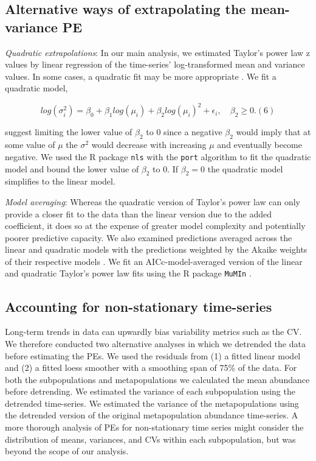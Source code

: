 \subsection{Alternative ways of extrapolating the mean-variance PE}

\textit{Quadratic extrapolations}: In our main analysis, we estimated Taylor's
power law z values by linear regression of the time-series' log-transformed mean
and variance values. In some cases, a quadratic fit may be more appropriate
\citep{routledge1991, perry1992}. We fit a quadratic model,

\begin{equation}
  log(\sigma^2_i) = \beta_0 + \beta_1 log(\mu_i) + \beta_2 log(\mu_i)^2 +
  \epsilon_i, \quad \beta_2 \ge 0. (6)
  \label{eq:quad-taylor}
\end{equation}

\noindent
\citet{perry1992} suggest limiting the lower value of $\beta_2$ to 0 since
a negative $\beta_2$ would imply that at some value of $\mu$ the $\sigma^2$
would decrease with increasing $\mu$ and eventually become negative. We used
the R package \texttt{nls} \citep{r2012} with the \texttt{port} algorithm
to fit the quadratic model and bound the lower value of $\beta_2$ to 0. If
$\beta_2 = 0$ the quadratic model simplifies to the linear model.

\textit{Model averaging}: Whereas the quadratic version of Taylor's power law
can only provide a closer fit to the data than the linear version due to the
added coefficient, it does so at the expense of greater model complexity and
potentially poorer predictive capacity. We also examined predictions averaged
across the linear and quadratic models with the predictions weighted by the
Akaike weights of their respective models \citep{burnham2002}. We fit an
AICc-model-averaged version of the linear and quadratic Taylor's power law fits
using the R package \texttt{MuMIn} \citep{barton2012}.

\subsection{Accounting for non-stationary time-series}

Long-term trends in data can upwardly bias variability metrics such as the CV.
We therefore conducted two alternative analyses in which we detrended
the data before estimating the PEs. We used the residuals from (1) a fitted
linear model and (2) a fitted loess smoother \citep[\texttt{loess}
function;][]{r2012} with a smoothing span of 75\% of the data. For both
the subpopulations and metapopulations we calculated the mean abundance before
detrending. We estimated the variance of each subpopulation using the detrended
time-series. We estimated the variance of the metapopulations using the
detrended version of the original metapopulation abundance time-series.
A more thorough analysis of PEs for non-stationary time series might
consider the distribution of means, variances, and CVs within each
subpopulation, but was beyond the scope of our analysis.

